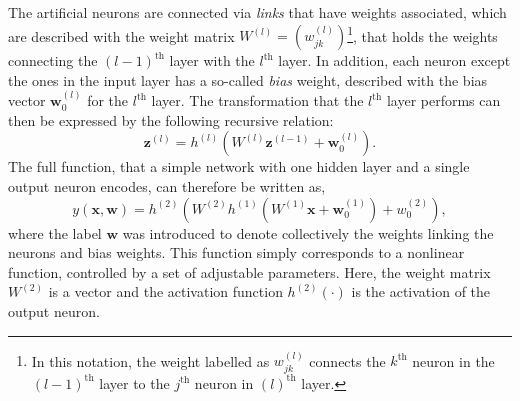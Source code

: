 The artificial neurons are connected via \emph{links} that have weights associated, which are described with the weight matrix $W^{(l)} = \left(w^{(l)}_{jk} \right)$\footnote{In this notation, the weight labelled as $w^{(l)}_{jk}$ connects the $k^\text{th}$ neuron in the $(l-1)^\text{th}$ layer to the $j^\text{th}$ neuron in $(l)^\text{th}$ layer.}, that holds the weights connecting the $(l-1)^{\text{th}}$ layer with the $l^{\text{th}}$ layer.
In addition, each neuron except the ones in the input layer has a so-called \emph{bias} weight, described with the bias vector $\pmb{w}^{(l)}_0$ for the $l^\text{th}$ layer.
The transformation that the $l^{\text{th}}$ layer performs can then be expressed by the following recursive relation:
\begin{equation}
    \label{eq:recursive-neuron-activation}
    \pmb{z}^{(l)} =  h^{(l)} \left( W^{(l)} \pmb{z}^{(l-1)}  + \pmb{w}^{(l)}_{0} \right).
\end{equation}
The full function, that a simple network with one hidden layer and a single output neuron encodes, can therefore be written as,
\begin{equation}
    y(\pmb{x}, \pmb{w}) = h^{(2)} \left( W^{(2)} h^{(1)} \left(  W^{(1)} \pmb{x} + \pmb{w}^{(1)}_{0}    \right) + w^{(2)}_{0} \right),
\end{equation}
where the label $\pmb{w}$ was introduced to denote collectively the weights linking the neurons and bias weights.
This function simply corresponds to a nonlinear function, controlled by a set of adjustable parameters. Here, the weight matrix $W^{(2)}$ is a vector and the activation function $h^{(2)}(\cdot)$ is the activation of the output neuron.


